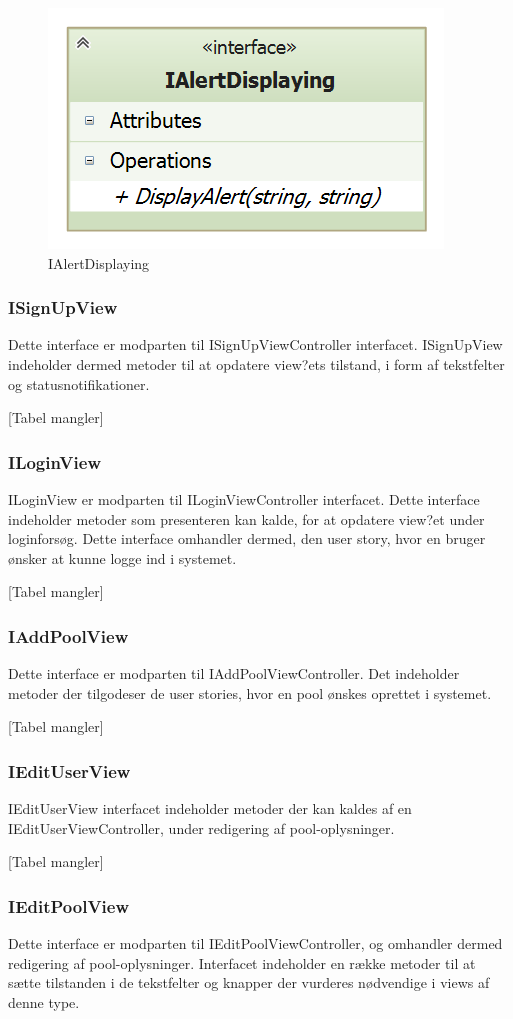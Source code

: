 \begin{figure}
	\centering
	\includegraphics[width=0.3\linewidth]{figs/design/application_ialertdisplaying}
	\caption{IAlertDisplaying}
	\label{fig:application_ialertdisplaying}
\end{figure}

\subsubsection{ISignUpView}
Dette interface er modparten til ISignUpViewController interfacet. ISignUpView indeholder dermed metoder til at opdatere view?ets tilstand, i form af tekstfelter og statusnotifikationer.

[Tabel mangler]

\subsubsection{ILoginView}
ILoginView er modparten til ILoginViewController interfacet. Dette interface indeholder metoder som presenteren kan kalde, for at opdatere view?et under loginforsøg. Dette interface omhandler dermed, den user story, hvor en bruger ønsker at kunne logge ind i systemet.

[Tabel mangler]

\subsubsection{IAddPoolView}
Dette interface er modparten til IAddPoolViewController. Det indeholder metoder der tilgodeser de user stories, hvor en pool ønskes oprettet i systemet.

[Tabel mangler]

\subsubsection{IEditUserView}
IEditUserView interfacet indeholder metoder der kan kaldes af en IEditUserViewController, under redigering af pool-oplysninger.

[Tabel mangler]

\subsubsection{IEditPoolView}
Dette interface er modparten til IEditPoolViewController, og omhandler dermed redigering af pool-oplysninger. Interfacet indeholder en række metoder til at sætte tilstanden i de tekstfelter og knapper der vurderes nødvendige i views af denne type.

